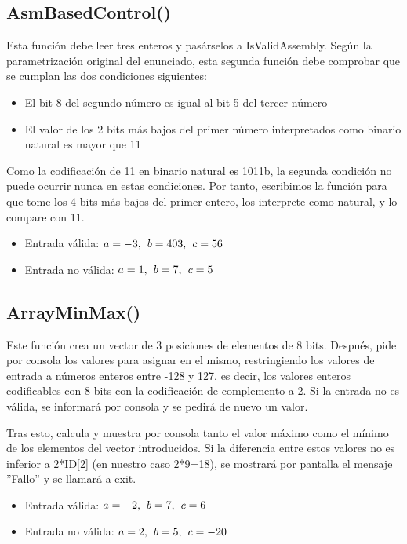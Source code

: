 \documentclass[11pt,a4paper]{article}
\begin{document}
\subsection{AsmBasedControl()}
\hspace{1mm}
Esta función debe leer tres enteros y pasárselos a IsValidAssembly.
Según la parametrización original del enunciado, esta segunda función debe comprobar que se
cumplan las dos condiciones siguientes:
\begin{itemize}
    \item El bit 8 del segundo número es igual al bit 5 del tercer número
    \item El valor de los 2 bits más bajos del primer número interpretados como 
        binario natural es mayor que 11
\end{itemize}
Como la codificación de 11 en binario natural es 1011b, la segunda condición no puede
ocurrir nunca en estas condiciones. Por tanto, escribimos la función para que tome los 4 bits
más bajos del primer entero, los interprete como natural, y lo compare con 11.
\begin{itemize}
  \item  Entrada válida: \(a = -3, \hspace{1.5mm} b = 403, \hspace{1.5mm} c = 56\)
  \item Entrada no válida: \(a = 1, \hspace{1.5mm} b = 7, \hspace{1.5mm} c = 5\)
\end{itemize}

\subsection{ArrayMinMax()}
Este función crea un vector de 3 posiciones de elementos de 8 bits. Después, 
pide por consola los valores para asignar en el mismo, restringiendo los valores de entrada a 
números enteros entre -128 y 127, es decir, los valores enteros codificables con 8 bits con la codificación de complemento a 2. 
Si la entrada no es válida, se informará por consola y se pedirá de nuevo un valor. 
\vspace{2ex}

Tras esto, calcula y muestra por consola tanto el valor máximo como el mínimo de los elementos del vector introducidos.
 Si la diferencia entre estos valores no es inferior a 2*ID[2] (en nuestro caso 2*9=18), se mostrará por pantalla el mensaje ''Fallo'' y se llamará a exit. 
 \begin{itemize}
  \item Entrada válida: \(a = -2, \hspace{1.5mm} b = 7, \hspace{1.5mm} c = 6\)
  \item Entrada no válida: \(a = 2, \hspace{1.5mm} b = 5, \hspace{1.5mm} c = -20\)
\end{itemize}
\newpage
\end{document}
